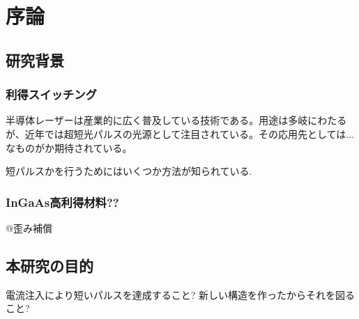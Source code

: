 \chapter{序論}
\section{研究背景}
\subsection{利得スイッチング}
半導体レーザーは産業的に広く普及している技術である。用途は多岐にわたるが、近年では超短光パルスの光源として注目されている。その応用先としては...なものがか期待されている。

短パルスかを行うためにはいくつか方法が知られている.

\subsection{InGaAs高利得材料??}
@歪み補償




\section{本研究の目的}
電流注入により短いパルスを達成すること?
新しい構造を作ったからそれを図ること?
